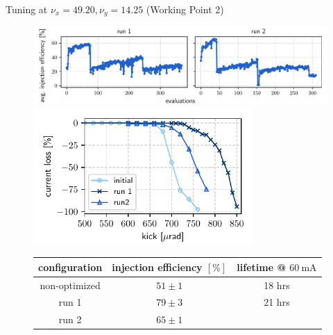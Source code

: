 \documentclass[aspectratio=169]{beamer}
\begin{document}
\begin{frame}{Tuning at $\nu_x = 49.20, \nu_y = 14.25$ (Working Point 2)}
    \begin{minipage}{0.55\textwidth}
        \begin{figure}
            \centering
            \includegraphics[width=\textwidth]{newtunes_history.pdf}
            \pause
            \includegraphics[width = 0.75\textwidth]{WEPL087_f3.pdf}
            \pause
            \begin{table}[]
                \scriptsize
                \begin{tabular}{ccc}
                \hline
                configuration & injection efficiency $[\%]$ & lifetime @ $\unit{60~\milli\ampere}$ \\ \hline
                non-optimized    & $51\pm1$                 &  18 hrs \\
                run 1            & $79\pm3$                 &  21 hrs  \\
                run 2            & $65\pm1$                 &           \\ \hline
                \end{tabular}
                \end{table}
        \end{figure}
    \end{minipage}
    \pause
    \hfill
    \begin{minipage}{0.44\textwidth}
        \begin{figure}
            \centering

\end{figure}
\end{minipage}
\end{frame}
\end{document}
